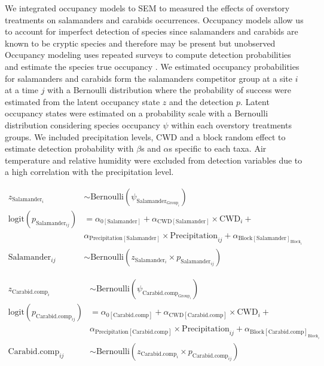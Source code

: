 We integrated occupancy models to SEM to measured the effects of overstory treatments on salamanders and carabids occurrences. 
Occupancy models allow us to account for imperfect detection of species since salamanders and carabids are known to be cryptic species and therefore may be present but unobserved \citep{baileyEstimatingSiteOccupancy2004,spiersEstimatingSpeciesMisclassification2022}
Occupancy modeling uses repeated surveys to compute detection probabilities and estimate the species true occupancy \citep{mackenzieEstimatingSiteOccupancy2002,mazerolleMakingGreatLeaps2007}.
We estimated occupancy probabilities for salamanders and carabids form the salamanders competitor group at a site $i$ at a time $j$ with a Bernoulli distribution where the probability of success were estimated from the latent occupancy state $z$ and the detection $p$.
Latent occupancy states were estimated on a probability scale with a Bernoulli distribution considering species occupancy $\psi$ within each overstory treatments groups.
We included precipitation levels, CWD and a block random effect to estimate detection probability with $\beta$s and $\alpha$s specific to each taxa.
Air temperature and relative humidity were excluded from detection variables due to a high correlation with the precipitation level.

\begin{align}
z_{\text{Salamander}_i} &\sim 
\text{Bernoulli}(\psi_{\text{Salamander}_{\text{Group}_i}}) \nonumber \\
\text{logit}(p_{\text{Salamander}_{ij}}) &= 
\alpha_{0[\text{Salamander}]} + \alpha_{\text{CWD}[\text{Salamander}]} \times \text{CWD}_i + \\
&\alpha_{\text{Precipitation}[\text{Salamander}]} \times \text{Precipitation}_{ij} + \alpha_{\text{Block}[\text{Salamander}]_{\text{Block}_i}} \nonumber \\
\text{Salamander}_{ij} &\sim 
\text{Bernoulli}(z_{\text{Salamander}_i} \times p_{\text{Salamander}_{ij}}) \nonumber
\end{align} 

\begin{align}
  z_{\text{Carabid.comp}_i} &\sim 
  \text{Bernoulli}(\psi_{\text{Carabid.comp}_{\text{Group}_i}}) \nonumber \\
  \text{logit}(p_{\text{Carabid.comp}_{ij}}) &= 
  \alpha_{0[\text{Carabid.comp}]} + \alpha_{\text{CWD}[\text{Carabid.comp}]} \times \text{CWD}_i + \\
  &\alpha_{\text{Precipitation}[\text{Carabid.comp}]} \times \text{Precipitation}_{ij} + \alpha_{\text{Block}[\text{Carabid.comp}]_{\text{Block}_i}} \nonumber \\
  \text{Carabid.comp}_{ij} &\sim 
  \text{Bernoulli}(z_{\text{Carabid.comp}_i} \times p_{\text{Carabid.comp}_{ij}}) \nonumber
  \end{align}

